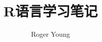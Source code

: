 \documentclass{ctexbook}
\newcommand{\documentTitle}
    {\texorpdfstring{R语言学习笔记}{R语言学习笔记}}
\newcommand{\documentAuthor}{Roger Young}
\begin{document}
\title{\documentTitle}
\author{\documentAuthor}

\maketitle
\tableofcontents








\printindex
\printglossaries
\end{document}
